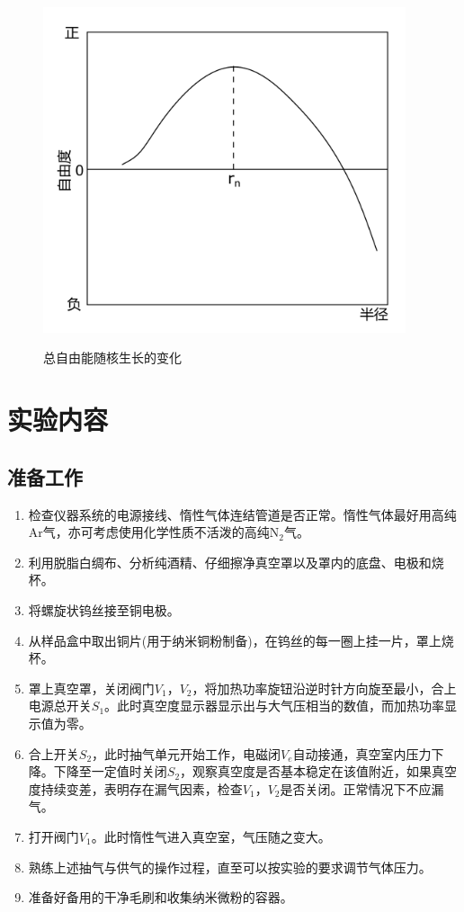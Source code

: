 \documentclass[a4paper]{article}
\begin{document}
\begin{figure}[!h]
\begin{minipage}{0.48\textwidth}
\begin{center}
\includegraphics[width=0.95\textwidth]{fig/fig6.pdf}\\
\caption{总自由能随核生长的变化}\label{fig6}
\end{center}
\end{minipage}
\end{figure}

\section{实验内容}
\subsection{准备工作}
\begin{enumerate}
\item 检查仪器系统的电源接线、惰性气体连结管道是否正常。惰性气体最好用高纯Ar气，亦可考虑使用化学性质不活泼的高纯N$_2$气。
\item 利用脱脂白绸布、分析纯酒精、仔细擦净真空罩以及罩内的底盘、电极和烧杯。
\item 将螺旋状钨丝接至铜电极。
\item 从样品盒中取出铜片(用于纳米铜粉制备)，在钨丝的每一圈上挂一片，罩上烧杯。
\item 罩上真空罩，关闭阀门$V_1$，$V_2$，将加热功率旋钮沿逆时针方向旋至最小，合上电源总开关$S_1$。此时真空度显示器显示出与大气压相当的数值，而加热功率显示值为零。
\item 合上开关$S_2$，此时抽气单元开始工作，电磁闭$V_e$自动接通，真空室内压力下降。下降至一定值时关闭$S_2$，观察真空度是否基本稳定在该值附近，如果真空度持续变差，表明存在漏气因素，检查$V_1$，$V_2$是否关闭。正常情况下不应漏气。
\item 打开阀门$V_1$。此时惰性气进入真空室，气压随之变大。
\item 熟练上述抽气与供气的操作过程，直至可以按实验的要求调节气体压力。
\item 准备好备用的干净毛刷和收集纳米微粉的容器。
\end{enumerate}
\end{document}
